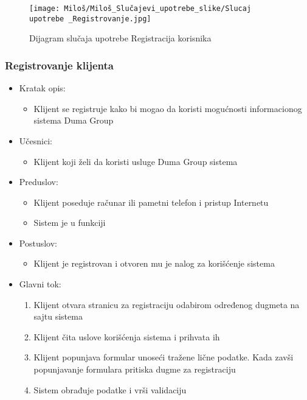\documentclass[a4paper]{article}
\begin{document}
\begin{figure}[htp]
    \centering
    \texttt{[image: Miloš/Miloš\_Slučajevi\_upotrebe\_slike/Slucaj upotrebe \_Registrovanje.jpg]}
    \caption{Dijagram slučaja upotrebe Registracija korisnika}
    \label{fig:Registracija}
\end{figure}

\subsubsection{Registrovanje klijenta}

\begin{itemize}
    \item Kratak opis:
        \begin{itemize}
            \item Klijent se registruje kako bi mogao da koristi mogućnosti informacionog sistema Duma Group
        \end{itemize}
    \item Učesnici:
        \begin{itemize}
            \item Klijent koji želi da koristi usluge Duma Group sistema
        \end{itemize}
    \item Preduslov:
        \begin{itemize}
            \item Klijent poseduje računar ili pametni telefon i pristup Internetu
            \item Sistem je u funkciji
        \end{itemize}
    \item Postuslov:
        \begin{itemize}
            \item Klijent je registrovan i otvoren mu je nalog za korišćenje sistema
        \end{itemize}
    \item Glavni tok:
        \begin{enumerate}
            \item  Klijent otvara stranicu za registraciju odabirom određenog dugmeta na sajtu sistema
            \item Klijent čita uslove korišćenja sistema i prihvata ih
            \item Klijent popunjava formular unoseći tražene lične podatke. Kada zavši popunjavanje formulara pritiska dugme za registraciju
            \item Sistem obrađuje podatke i vrši validaciju

\end{enumerate}
\end{itemize}
\end{document}
